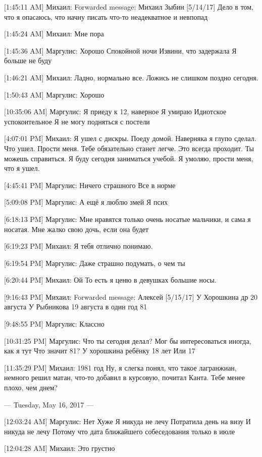\documentclass{article}
\begin{document}
[1:45:11 AM] Михаил:
Forwarded message: Михаил Зыбин [5/14/17] 
Дело в том, что я опасаюсь, что начну писать что-то неадекватное и невпопад

[1:45:24 AM] Михаил:
Мне пора

[1:45:36 AM] Маргулис:
Хорошо
 Спокойной ночи
 Извини, что задержала
 Я больше не буду

[1:46:21 AM] Михаил:
Ладно, нормально все. Ложись не слишком поздно сегодня.

[1:50:43 AM] Маргулис:
Хорошо

[10:35:06 AM] Маргулис:
Я приеду к 12, наверное
 Я умираю
 Идиотское успокоительное
 Я не могу подняться с постели

[4:07:01 PM] Михаил:
Я ушел с дискры. Поеду домой.
 Наверняка я глупо сделал.
 Что ушел.
 Прости меня.
 Тебе обязательно станет легче. Это всегда проходит.
 Ты можешь справиться.
 Я буду сегодня заниматься учебой.
 Я умоляю, прости меня, что я ушел.

[4:45:41 PM] Маргулис:
Ничего страшного
 Все в норме

[5:09:08 PM] Маргулис:
А ещё я люблю змей
 Я псих

[6:18:13 PM] Маргулис:
Мне нравятся только очень носатые мальчики, и сама я носатая. Мне жалко свою дочь, если она будет

[6:19:23 PM] Михаил:
Я тебя отлично понимаю.

[6:19:54 PM] Маргулис:
Даже страшно подумать, о чем ты

[6:20:44 PM] Михаил:
Ой
 То есть я ценю в девушках большие носы.

[9:16:43 PM] Михаил:
Forwarded message: Алексей [5/15/17] 
У Хорошкина др 20 августа
У Рыбникова 19 августа
в один год
81

[9:48:55 PM] Маргулис:
Классно

[10:31:25 PM] Маргулис:
Что ты сегодня делал?
 Мог бы интересоваться иногда, как я тут
 Что значит 81?
 У хорошкина ребёнку 18 лет
 Или 17

[11:35:29 PM] Михаил:
1981 год
 Ну, я слегка понял, что такое лагранжиан, немного решил матан, что-то добавил в курсовую, почитал Канта.
 Тебе менее плохо, чем днем?

--- Tuesday, May 16, 2017 ---

[12:03:24 AM] Маргулис:
Нет
 Хуже
 Я никуда не лечу
 Потратила день на визу
 И никуда не лечу
 Потому что дата ближайшего собеседования только в июле

[12:04:28 AM] Михаил:
Это грустно
\end{document}

